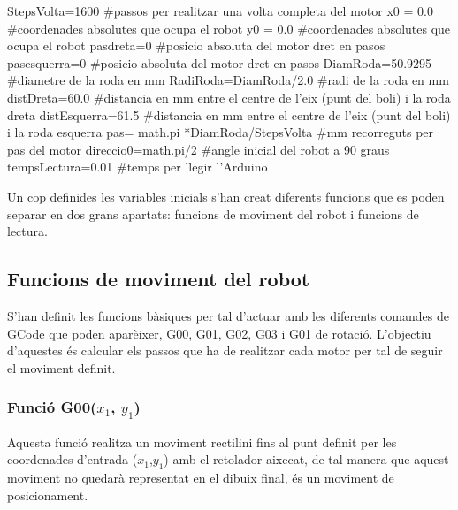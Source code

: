 \begin{python}
	StepsVolta=1600  #passos per realitzar una volta completa del motor
	x0 = 0.0  #coordenades absolutes que ocupa el robot
	y0 = 0.0  #coordenades absolutes que ocupa el robot
	pasdreta=0  #posicio absoluta del motor dret en pasos
	pasesquerra=0  #posicio absoluta del motor dret en pasos
	DiamRoda=50.9295  #diametre de la roda en mm
	RadiRoda=DiamRoda/2.0  #radi de la roda en mm
	distDreta=60.0  #distancia en mm entre el centre de l'eix (punt del boli) i la roda dreta
	distEsquerra=61.5  #distancia en mm entre el centre de l'eix (punt del boli) i la roda esquerra
	pas= math.pi *DiamRoda/StepsVolta  #mm recorreguts per pas del motor
	direccio0=math.pi/2  #angle inicial del robot a 90 graus
	tempsLectura=0.01  #temps per llegir l'Arduino 
\end{python}


Un cop definides les variables inicials s’han creat diferents funcions que es poden separar en dos grans apartats: funcions de moviment del robot i funcions de lectura. 

\subsection{Funcions de moviment del robot}
S’han definit les funcions bàsiques per tal d’actuar amb les diferents comandes de GCode que poden aparèixer, G00, G01, G02, G03 i G01 de rotació. L’objectiu d’aquestes és calcular els passos que ha de realitzar cada motor per tal de seguir el moviment definit. 

\subsubsection{Funció G00($x_{1}$, $y_{1}$)}\label{sec:G00}

Aquesta funció realitza un moviment rectilini fins al punt definit per les coordenades d’entrada ($x_{1}$,$y_{1}$) amb el retolador aixecat, de tal manera que aquest moviment no quedarà representat en el dibuix final, és un moviment de posicionament.

